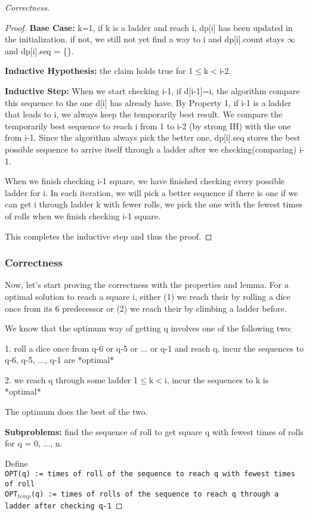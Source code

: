 \documentclass[openany]{article}
\begin{document}
\begin{proof}[Correctness]{}
\begin{proof}
        \textbf{Base Case:} k=1, if k is a ladder and reach i, dp[i] has been updated in the initialization. if not, we still not yet find a way to i and dp[i].count stays $\infty$ and dp[i].seq = \{\}.
        
        \textbf{Inductive Hypothesis:} the claim holds true for  1$\leq$k$<$i-2.
        
        \textbf{Inductive Step:} When we start checking i-1, if d[i-1]=i, the algorithm compare this sequence to the one d[i] has already have. By Property 1, if i-1 is a ladder that leads to i, we always keep the temporarily best result. We compare the temporarily best sequence to reach i from 1 to i-2 (by strong IH) with the one from i-1. Since the algorithm always pick the better one, dp[i].seq stores the best possible sequence to arrive itself through a ladder after we checking(comparing) i-1.
        
        When we finish checking i-1 square, we have finished checking every possible ladder for i. In each iteration, we will pick a better sequence if there is one if we can get i through ladder k with fewer rolls, we pick the one with the fewest times of rolls when we finish checking i-1 square.
        
        This completes the inductive step and thus the proof.
    \end{proof}
\subsubsection*{Correctness}
Now, let's start proving the correctness with the properties and lemma.
For a optimal solution to reach a square i, either (1) we reach their by rolling a dice once from its 6 predecessor or (2) we reach their by climbing a ladder before.

We know that the optimum way of getting q involves one of the following two:

1. roll a dice once from q-6 or q-5 or ... or q-1 and reach q, incur the sequences to  q-6, q-5, ..., q-1 are *optimal*

2. we reach q through some ladder 1$\leq$k$<$i, incur the sequences to k is *optimal*

The optimum does the best of the two.

\textbf{Subproblems:} find the sequence of roll to get square q with fewest times of rolls for q = 0, ..., n.

Define \texttt{\\OPT(q) := times of roll of the sequence to reach q with fewest times of roll \\OPT$_{temp}$(q) := times of rolls of the sequence to reach q through a ladder after checking q-1}


\end{proof}
\end{document}
